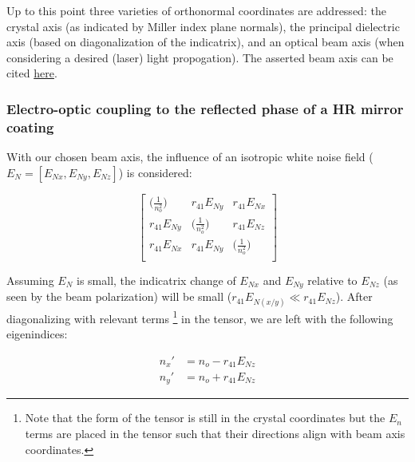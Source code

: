 Up to this point three varieties of orthonormal coordinates are addressed: the crystal axis (as indicated by Miller index plane normals), the principal dielectric axis (based on diagonalization of the indicatrix), and an optical beam axis (when considering a desired (laser) light propogation). The asserted beam axis can be cited \hyperref[fig:algaas_coords]{here}.

\subsubsection{Electro-optic coupling to the reflected phase of a HR mirror coating}
With our chosen beam axis, the influence of an isotropic white noise field ($E_N = [E_{Nx},E_{Ny},E_{Nz}]$) is considered:

\begin{equation}
 \left[ {\begin{array}{ccc}
   \big( \frac{1}{n_o ^2} \big)& r_{41}E_{Ny} & r_{41} E_{Nx}\\
   r_{41}E_{Ny} & \big( \frac{1}{n_o ^2} \big) & r_{41} E_{Nz}\\
   r_{41} E_{Nx} & r_{41} E_{Ny} & \big( \frac{1}{n_o ^2} \big)\\
  \end{array}} \right]
\end{equation}

\noindent Assuming $E_N$ is small, the indicatrix change of $E_{Nx}$ and $E_{Ny}$ relative to $E_{Nz}$ (as seen by the beam polarization) will be small ($r_{41}E_{N(x/y)} \ll r_{41}E_{Nz}$). After diagonalizing with relevant terms \footnote{Note that the form of the tensor is still in the crystal coordinates but the $E_n$ terms are placed in the tensor such that their directions align with beam axis coordinates.} in the tensor, we are left with the following eigenindices:

\begin{equation}
\begin{aligned}
n_x' & = n_o - r_{41}E_{Nz} \\
n_y' & = n_o + r_{41}E_{Nz}
\end{aligned}
\end{equation}


